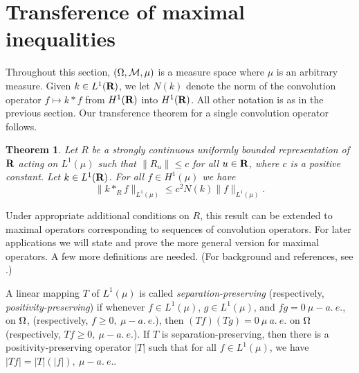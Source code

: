 \section{Transference of maximal inequalities}
\newtheorem{single}{Theorem}[section]
\newtheorem{main-theorem}[single]{Theorem}
\newtheorem{vector-version}[single]{Lemma}
\newtheorem{lemma-sec3}[single]{Lemma}
\newtheorem{transference-max-multiplier}[single]{Theorem}
\newtheorem{normalized-version}[single]{Theorem}
Throughout this section, 
$(\Omega,{\cal M},\mu)$ is a measure space where
$\mu$ is an arbitrary measure.  
Given $k\in L^1(\R)$, we let
$N(k)$ denote the norm of the
convolution operator 
$f\mapsto k*f$ from $H^1(\R)$ into $H^1(\R)$.
All other notation is as in the previous section.
Our transference theorem for a single convolution
operator follows.  
\begin{single}
Let $R$ be a strongly continuous uniformly bounded
representation of $\R$ acting on $L^1(\mu)$ such that
$\|R_u\|\leq c$ for all $u\in \R$, 
where $c$ is a positive constant.
Let $k\in L^1(\R)$.
For all $f\in H^1(\mu)$ we have
$$\|k*_Rf\|_{L^1(\mu)}\leq c^2 N(k)\|f\|_{L^1(\mu)}.$$ 
\label{single}
\end{single}
Under appropriate additional conditions on $R$, this result can 
be extended to maximal operators corresponding to
 sequences of convolution operators.
For later applications we will state and prove
 the more general version
for maximal operators.  
A few more definitions are needed.
(For background and references, see \cite{abg1}.)


A linear mapping
$T$ of $L^1(\mu)$ is called {\em separation-preserving}
(respectively, {\em positivity-preserving})
if whenever $f\in L^1(\mu)$, $g\in L^1(\mu)$, and
$fg=0\ \mu-a.\ e.$, on $\Omega$, 
(respectively, $f\geq 0,\ \mu- a.\ e.$),
then $(Tf)(Tg)=0\ \mu\ a.\ e.$
on $\Omega$ (respectively, $Tf\geq 0,\ \mu-a.\ e.$). 
If $T$ is separation-preserving, then there is a 
positivity-preserving operator $|T|$ such that for all
$f\in L^1(\mu)$, we have $|Tf|=|T|(|f|),\ \mu-a.\ e.$.

